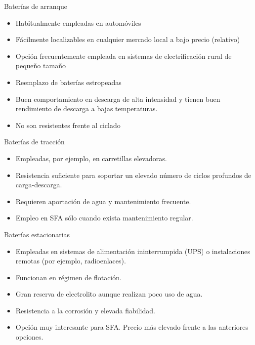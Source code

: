 \documentclass[xcolor={usenames,svgnames,dvipsnames}]{beamer}
\begin{document}
\begin{frame}[label={sec:org8c73e3a}]{Baterías de arranque}
\begin{itemize}
\item Habitualmente empleadas en automóviles

\item Fácilmente localizables en cualquier mercado local a bajo precio (relativo)

\item Opción frecuentemente empleada en sistemas de electrificación rural de pequeño tamaño

\item Reemplazo de baterías estropeadas

\item Buen comportamiento en descarga de alta intensidad y tienen buen rendimiento de descarga a bajas temperaturas.

\item No son resistentes frente al ciclado
\end{itemize}
\end{frame}

\begin{frame}[label={sec:org360d8d7}]{Baterías de tracción}
\begin{itemize}
\item Empleadas, por ejemplo, en carretillas elevadoras.

\item Resistencia suficiente para soportar un elevado número de ciclos profundos de carga-descarga.

\item Requieren aportación de agua y mantenimiento frecuente.

\item Empleo en SFA sólo cuando exista mantenimiento regular.
\end{itemize}
\end{frame}

\begin{frame}[label={sec:orga06cd6e}]{Baterías estacionarias}
\begin{itemize}
\item Empleadas en sistemas de alimentación ininterrumpida (UPS) o instalaciones remotas (por ejemplo, radioenlaces).

\item Funcionan en régimen de flotación.

\item Gran reserva de electrolito aunque realizan poco uso de agua.

\item Resistencia a la corrosión y elevada fiabilidad.

\item Opción muy interesante para SFA. Precio más elevado frente a las anteriores opciones.
\end{itemize}
\end{frame}
\end{document}
